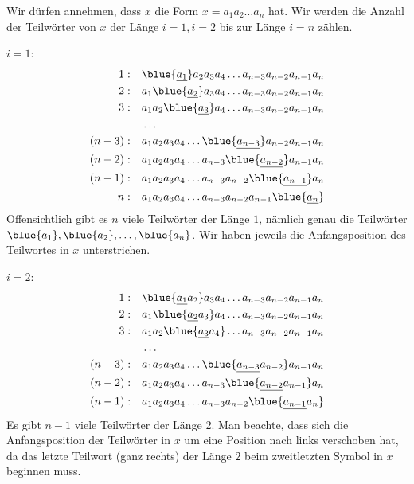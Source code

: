 \begin{myanswer}[mychallenge:0207]
	Wir dürfen annehmen, dass $x$ die Form $x = a_1a_2\ldots a_n$ hat. Wir werden die Anzahl der Teilwörter von $x$ der Länge $i = 1, i = 2$ bis zur Länge $i = n$ zählen.

	\underline{$i = 1$}:
	\begin{align*}
		1:\quad     & \blue{\underline{a_1}}a_2a_3a_4\ldots a_{n-3}a_{n-2}a_{n-1}a_n \\
		2:\quad     & a_1\blue{\underline{a_2}}a_3a_4\ldots a_{n-3}a_{n-2}a_{n-1}a_n \\
		3:\quad     & a_1a_2\blue{\underline{a_3}}a_4\ldots a_{n-3}a_{n-2}a_{n-1}a_n \\
		            & \ldots                                                         \\
		(n-3):\quad & a_1a_2a_3a_4\ldots \blue{\underline{a_{n-3}}}a_{n-2}a_{n-1}a_n \\
		(n-2):\quad & a_1a_2a_3a_4\ldots a_{n-3}\blue{\underline{a_{n-2}}}a_{n-1}a_n \\
		(n-1):\quad & a_1a_2a_3a_4\ldots a_{n-3}a_{n-2}\blue{\underline{a_{n-1}}}a_n \\
		n: \quad    & a_1a_2a_3a_4\ldots a_{n-3}a_{n-2}a_{n-1}\blue{\underline{a_n}}
	\end{align*}
	Offensichtlich gibt es $n$ viele Teilwörter der Länge $1$, nämlich genau die Teilwörter $\blue{a_1},\blue{a_2},\ldots ,\blue{a_n}$. Wir haben jeweils die Anfangsposition des Teilwortes in $x$ unterstrichen.

	\underline{$i = 2$}:
	\begin{align*}
		1: \quad    & \blue{\underline{a_1}a_2}a_3a_4\ldots a_{n-3}a_{n-2}a_{n-1}a_n \\
		2: \quad    & a_1\blue{\underline{a_2}a_3}a_4\ldots a_{n-3}a_{n-2}a_{n-1}a_n \\
		3: \quad    & a_1a_2\blue{\underline{a_3}a_4}\ldots a_{n-3}a_{n-2}a_{n-1}a_n \\
		            & \ldots                                                         \\
		(n-3):\quad & a_1a_2a_3a_4\ldots \blue{\underline{a_{n-3}}a_{n-2}}a_{n-1}a_n \\
		(n-2):\quad & a_1a_2a_3a_4\ldots a_{n-3}\blue{\underline{a_{n-2}}a_{n-1}}a_n \\
		(n-1):\quad & a_1a_2a_3a_4\ldots a_{n-3}a_{n-2}\blue{\underline{a_{n-1}}a_n}
	\end{align*}
	Es gibt $n-1$ viele Teilwörter der Länge $2$. Man beachte, dass sich die Anfangsposition der Teilwörter in $x$ um eine Position nach links verschoben hat, da das letzte Teilwort (ganz rechts) der Länge $2$ beim zweitletzten Symbol in $x$ beginnen muss.


\end{myanswer}
